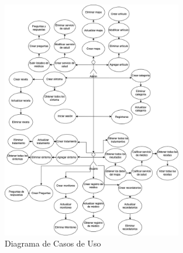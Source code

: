 \begin{figure}[h]
    \centering
    \includegraphics[width=0.7\textwidth]{img/manual/diagrama_casos_de_uso.png}
    \caption{Diagrama de Casos de Uso} \label{Img:Diseno+Casos+de+Uso}
\end{figure} 


